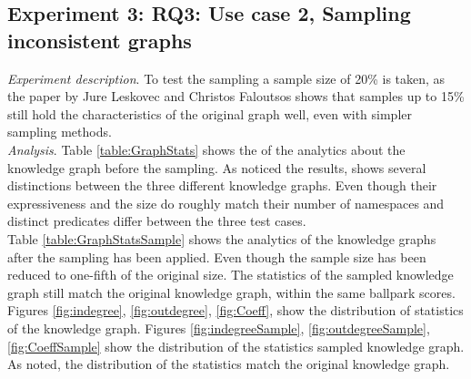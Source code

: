 \documentclass{article}
\begin{document}
\subsection{Experiment 3: \textbf{RQ3}: Use case 2, Sampling inconsistent graphs} 
\textit{Experiment description}. To test the sampling a sample size of 20\% is taken, as the paper by Jure Leskovec and Christos Faloutsos \cite{Leskovec:2006} shows that samples
up to 15\% still hold the characteristics of the original graph well, even with simpler sampling methods. \\

\textit{Analysis}. Table \ref{table:GraphStats} shows the of the analytics about the knowledge graph before the sampling. As noticed the results, shows several distinctions between the three different knowledge graphs. Even though their expressiveness and the size do roughly match their number of namespaces and distinct predicates 
differ between the three test cases.\\
Table \ref{table:GraphStatsSample} shows the analytics of the knowledge graphs after the sampling has been applied. Even though the sample size has been reduced to one-fifth of the original size. The statistics of the sampled knowledge graph still match the original knowledge graph, within the same ballpark scores.
Figures \ref{fig:indegree},  \ref{fig:outdegree},  \ref{fig:Coeff}, show the distribution of statistics of the knowledge graph. %
Figures \ref{fig:indegreeSample},  \ref{fig:outdegreeSample},  \ref{fig:CoeffSample} show the distribution of the statistics sampled knowledge graph. As noted, the distribution
of the statistics match the original knowledge graph. \\

\begin{table}[!t]
	\centering
	\caption{table showing several statistics about graphs.}
	\label{table:GraphStatsSample}
\end{table}
\end{document}
